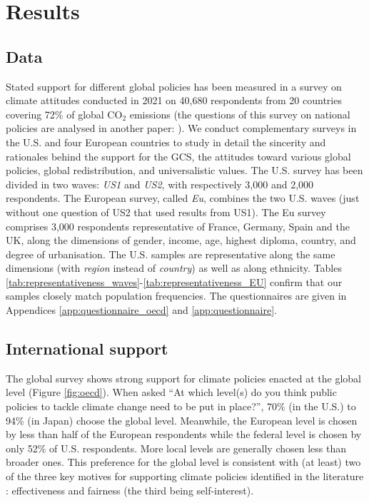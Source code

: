 \section{Results}
\subsection{Data}
Stated support for different global policies has been measured in %
a survey on climate attitudes conducted in 2021 on 40,680 respondents from 20 countries covering 72\% of global CO$_\text{2}$ emissions (the questions of this survey on national policies are analysed in another paper: \citealp{dechezlepretre_fighting_2022}). We conduct complementary surveys in the U.S. and four European countries to study in detail the sincerity and rationales behind the support for the GCS, the attitudes toward various global policies, global redistribution, and universalistic values. The U.S. survey has been divided in two waves: \textit{US1} and \textit{US2}, with respectively 3,000 and 2,000 respondents. The European survey, called \textit{Eu}, combines the two U.S. waves (just without one question of US2 that used results from US1). The Eu survey comprises 3,000 respondents representative of France, Germany, Spain and the UK, along the dimensions of gender, income, age, highest diploma, country, and degree of urbanisation. The U.S. samples are representative along the same dimensions (with \textit{region} instead of \textit{country}) as well as along ethnicity. Tables \ref{tab:representativeness_waves}-\ref{tab:representativeness_EU} confirm that our samples closely match population frequencies. The questionnaires are given in Appendices \ref{app:questionnaire_oecd} and \ref{app:questionnaire}.

\subsection{International support}
The global survey shows strong support for climate policies enacted at the global level (Figure \ref{fig:oecd}). When asked ``At which level(s) do you think public policies to tackle climate change need to be put in place?'', 70\% (in the U.S.) to 94\% (in Japan) choose the global level. Meanwhile, the European level is chosen by less than half of the European respondents while the federal level is chosen by only 52\% of U.S. respondents. More local levels are generally chosen less than broader ones. This preference for the global level is consistent with (at least) two of the three key motives for supporting climate policies identified in the literature %
\citep{klenert_making_2018,douenne_yellow_2022,dechezlepretre_fighting_2022}: effectiveness and fairness (the third being self-interest). %

